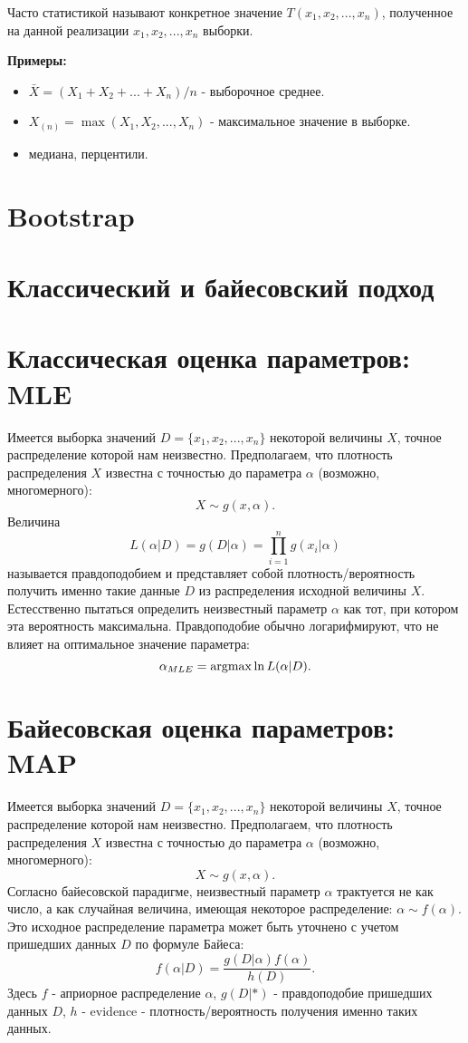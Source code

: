 Часто статистикой называют конкретное значение $T(x_1, x_2, ..., x_n)$, полученное на данной реализации $x_1, x_2, ..., x_n$ выборки.

\textbf{Примеры:}
\begin{itemize}
    \item $\bar{X} = (X_1 + X_2 + ... + X_n)/n$ - выборочное среднее.
    \item $X_{(n)} = \max(X_1, X_2, ..., X_n)$ - максимальное значение в выборке.
    \item медиана, перцентили.
\end{itemize}


\section{Bootstrap}


\section{Классический и байесовский подход}


\section{Классическая оценка параметров: MLE}

Имеется выборка значений $D = \{x_1, x_2, ..., x_n\}$ некоторой величины $X$, точное распределение которой нам неизвестно.  Предполагаем, что плотность распределения $X$ известна с точностью до параметра $\alpha$ (возможно, многомерного): 
$$
X \sim g(x, \alpha).
$$
Величина
$$
L(\alpha|D) = g(D | \alpha) = \prod_{i=1}^n g(x_i | \alpha)
$$
называется правдоподобием и представляет собой плотность/вероятность получить именно такие данные $D$ из распределения исходной величины $X$. Естесственно пытаться определить неизвестный параметр $\alpha$ как тот, при котором эта вероятность максимальна. Правдоподобие обычно логарифмируют, что не влияет на оптимальное значение параметра:
$$
\alpha_{MLE} = \operatorname*{argmax}{\ln{L(\alpha|D)}}.
$$

\section{Байесовская оценка параметров: MAP}

Имеется выборка значений $D = \{x_1, x_2, ..., x_n\}$ некоторой величины $X$, точное распределение которой нам неизвестно.  Предполагаем, что плотность распределения $X$ известна с точностью до параметра $\alpha$ (возможно, многомерного): 
$$
X \sim g(x, \alpha).
$$
Согласно байесовской парадигме, неизвестный параметр $\alpha$ трактуется не как число, а как случайная величина, имеющая некоторое распределение: $\alpha \sim f(\alpha)$. Это исходное распределение параметра может быть уточнено с учетом пришедших данных $D$ по формуле Байеса:
$$
f(\alpha | D) = \frac{g(D | \alpha)f(\alpha)}{h(D)}.
$$
Здесь $f$ - априорное распределение $\alpha$, $g(D | *)$ - правдоподобие пришедших данных $D$, 
$h$ - evidence - плотность/вероятность получения именно таких данных.

